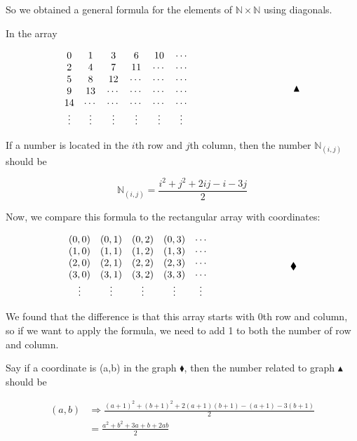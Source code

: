 \documentclass[12pt]{article}
\begin{document}
\vspace*{0.3cm}
So we obtained a general formula for the elements of $\mathbb{N} \times
\mathbb{N}$ using diagonals.


In the array

\[ \begin{matrix}
    0&1&3&6&10&\cdots \\
    2&4&7&11& \cdots &\cdots \\
    5&8&12&\cdots&\cdots&\cdots \\
    9&13&\cdots&\cdots&\cdots&\cdots\\
    14&\cdots&\cdots&\cdots&\cdots&\cdots \\
    \vdots&\vdots&\vdots&\vdots&\vdots&\vdots
    
\end{matrix} \hspace*{3.8cm} \blacktriangle\]

If a number is located in the $i$th row and $j$th column, 
then the number $\mathbb{N}_{(i,j)}$ should be

\[ \mathbb{N}_{(i,j)} = \frac{i^2+j^2+2ij-i-3j}{2} \]

Now, we compare this formula to the rectangular array with coordinates:

\[ \begin{matrix}
    (0,0) & (0,1) & (0,2) & (0,3) & \cdots \\
    (1,0) & (1,1) & (1,2) & (1,3) & \cdots \\
    (2,0) & (2,1) & (2,2) & (2,3) & \cdots \\
    (3,0) & (3,1) & (3,2) & (3,3) & \cdots \\
    \vdots & \vdots &\vdots &\vdots &\vdots 
\end{matrix}  \hspace*{3cm} \blacklozenge\]

We found that the difference is that this array starts with
$0$th row and column, so if we want to apply the formula, we need to
add 1 to both the number of row and column.

\vspace*{0.3cm}
Say if a coordinate is (a,b) in the graph $\blacklozenge$, then the number related
to graph $\blacktriangle$ should be

\begin{align*}
     (a,b) & \Longrightarrow \frac{(a+1)^2+(b+1)^2+2(a+1)(b+1) -(a+1)-3(b+1)}{2} \\
     & = \frac{a^2+b^2+3a+b+2ab}{2}
\end{align*}
\end{document}
